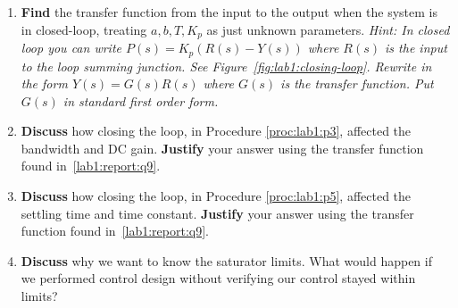 \begin{deliverable}[label={lab1:report}]
\begin{enumerate}[label={(\arabic*)}]
{    }
    \item{
      \textbf{Find} the transfer
      function from the input to the output when the system is in
      closed-loop, treating \(a, b, T, K_p\) as just unknown parameters.
      \emph{Hint: In closed loop you can write \(P(s) = K_p(R(s) - Y(s))\)
      where \(R(s)\) is the input to the loop summing junction. See
      Figure~\ref{fig:lab1:closing-loop}.
      Rewrite in the form \(Y(s) = G(s) R(s)\) where \(G(s)\) is the
      transfer function. Put \(G(s)\) in standard first order form.}
      \label{lab1:report:q9}
    }
    \item{
      \textbf{Discuss} how closing the loop, in Procedure
      \ref{proc:lab1:p3}, affected the bandwidth and DC gain.
      \textbf{Justify} your answer using the transfer function
      found in~\ref{lab1:report:q9}.
      \label{lab1:report:q10}
    }
    \item{
      \textbf{Discuss} how closing the loop, in Procedure
      \ref{proc:lab1:p5}, affected the settling time and time constant.
      \textbf{Justify} your answer using the transfer function
      found in~\ref{lab1:report:q9}.
      \label{lab1:report:q11}
    }
    \item{
      \textbf{Discuss} why we want to know the saturator limits. What would
      happen if we performed control design without verifying our control
      stayed within limits?
      \label{lab1:report:q12}
    }
  \end{enumerate}
\end{deliverable}

